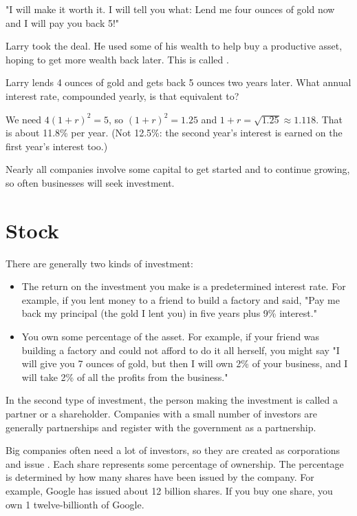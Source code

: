 "I will make it worth it.  I will tell you what: Lend me four ounces of gold now and I will pay you back 5!"

Larry took the deal. He used some of his wealth to help buy a productive
asset, hoping to get more wealth back later. This is called
.

\begin{Exercise}[title={Larry's interest rate}, label=econ_rate]
Larry lends 4 ounces of gold and gets back 5 ounces two years later. What
annual interest rate, compounded yearly, is that equivalent to?
\end{Exercise}
\begin{Answer}[ref=econ_rate]
We need $4(1 + r)^2 = 5$, so $(1 + r)^2 = 1.25$ and
$1 + r = \sqrt{1.25} \approx 1.118$. That is about 11.8\% per year. (Not
12.5\%: the second year's interest is earned on the first year's
interest too.)
\end{Answer} Nearly all companies involve some capital to get started and to continue growing, so often businesses will seek investment.

\section{Stock}

There are generally two kinds of investment:
\begin{itemize}
\item The return on the investment you make is a predetermined interest rate. For example, if you lent money to a friend to build a factory and said, "Pay me back my principal (the gold I lent you) in five years plus 9\% interest."
\item You own some percentage of the asset.  For example, if your friend was building a factory and could not afford to do it all herself, you might say "I will give you 7 ounces of gold, but then I will own 2\% of your business, and I will take 2\% of all the profits from the business."
\end{itemize}

In the second type of investment, the person making the investment is called a partner or a shareholder.  Companies with a small number of investors are generally partnerships and register with the government as a partnership.

Big companies often need a lot of investors, so they are created as corporations and issue .  Each share represents some percentage of ownership.  The percentage is determined by how many shares have been issued by the company.  For example, Google has issued about 12 billion shares. If you buy one share, you own 1 twelve-billionth of Google.

